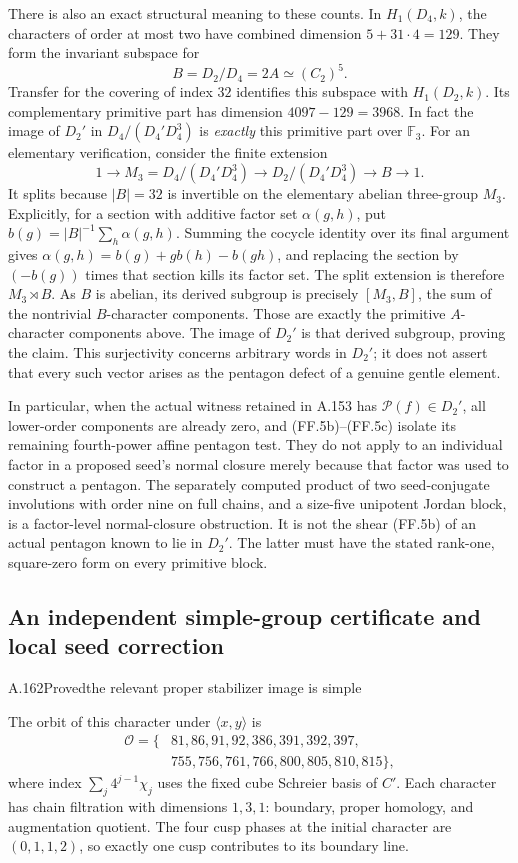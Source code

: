 There is also an exact structural meaning to these counts.
In $H_1(D_4,k)$, the characters of order at most two have
combined dimension $5+31\cdot4=129$. They form the
invariant subspace for
\[
                    B=D_2/D_4=2A\simeq(C_2)^5.
\]
Transfer for the covering of index $32$ identifies this
subspace with $H_1(D_2,k)$. Its complementary primitive
part has dimension $4097-129=3968$.
In fact the image of $D_2'$ in $D_4/(D_4'D_4^3)$ is
\emph{exactly} this primitive part over $\mathbb F_3$.
For an elementary verification, consider the finite extension
\[
 1\longrightarrow M_3=D_4/(D_4'D_4^3)
 \longrightarrow D_2/(D_4'D_4^3)
 \longrightarrow B\longrightarrow1.
\]
It splits because $|B|=32$ is invertible on the elementary
abelian three-group $M_3$. Explicitly, for a section with
additive factor set $\alpha(g,h)$, put
$b(g)=|B|^{-1}\sum_h\alpha(g,h)$. Summing the cocycle
identity over its final argument gives
$\alpha(g,h)=b(g)+g b(h)-b(gh)$, and replacing the section
by $(-b(g))$ times that section kills its factor set.
The split extension is therefore $M_3\rtimes B$. As $B$
is abelian, its derived subgroup is precisely $[M_3,B]$,
the sum of the nontrivial $B$-character components. Those
are exactly the primitive $A$-character components above.
The image of $D_2'$ is that derived subgroup, proving the
claim. This surjectivity concerns arbitrary words in
$D_2'$; it does not assert that every such vector arises
as the pentagon defect of a genuine gentle element.

In particular, when the actual witness retained in A.153
has $\mathcal P(f)\in D_2'$, all lower-order components
are already zero, and (FF.5b)--(FF.5c) isolate its remaining
fourth-power affine pentagon test. They do not apply to an
individual factor in a proposed seed's normal closure merely
because that factor was used to construct a pentagon.
The separately computed product of two seed-conjugate
involutions with order nine on full chains, and a size-five
unipotent Jordan block, is a factor-level normal-closure
obstruction. It is not the shear (FF.5b) of an actual
pentagon known to lie in $D_2'$. The latter must have the
stated rank-one, square-zero form on every primitive block.

\subsection{An independent simple-group certificate and local seed correction}


\begin{statement}{A.162}{Proved}{the relevant proper stabilizer image is simple}
\end{statement}
The orbit of this character under $\langle x,y\rangle$ is
\[
\begin{split}
\mathcal O=\{&81,86,91,92,386,391,392,397,\\
             &755,756,761,766,800,805,810,815\},
\end{split}
\]
where index $\sum_j4^{j-1}\chi_j$ uses the fixed cube
Schreier basis of $C'$.  Each character has chain filtration
with dimensions $1,3,1$: boundary, proper homology, and
augmentation quotient.  The four cusp phases at the
initial character are $(0,1,1,2)$, so exactly one cusp
contributes to its boundary line.

